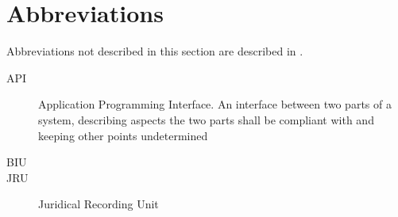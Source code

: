 \section{Abbreviations}

Abbreviations not described in this section are described in
\cite{subset-023}.

\begin{description}
\item[API] Application Programming Interface. An interface between two
  parts of a system, describing aspects the two parts shall be
  compliant with and keeping other points undetermined
\item [BIU] 
\item [JRU] Juridical Recording Unit
\end{description}


